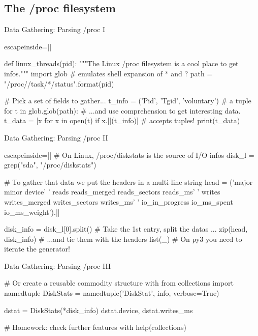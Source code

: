 \subsection{The /proc filesystem}
\begin{frame}[fragile]{Data Gathering: Parsing /proc I}
\begin{pythoncode*}{escapeinside=||}

def linux_threads(pid):
  """The Linux /proc filesystem is a cool place to get infos."""
  import glob # emulates shell expansion of * and ?
  path = "/proc/{}/task/*/status".format(pid)
  
  # Pick a set of fields to gather...
  t_info = ('Pid', 'Tgid', 'voluntary') # a tuple
  for t in glob.glob(path):
    # ...and use comprehension to get interesting data.
    t_data = [x for x in open(t) 
        if x.||(t_info)] #  accepts tuples!
    print(t_data)
\end{pythoncode*}
\end{frame}



\begin{frame}[fragile]{Data Gathering: Parsing /proc II}
\begin{pythoncode*}{escapeinside=||}
# On Linux, /proc/diskstats is the source of I/O infos
disk_l = grep("sda", "/proc/diskstats")

# To gather that data we put the headers in a multi-line string
head = ('major minor device'
        ' reads reads_merged reads_sectors reads_ms'
        ' writes writes_merged writes_sectors writes_ms'
        ' io_in_progress io_ms_spent io_ms_weight').||
        
disk_info = disk_l[0].split() # Take the 1st entry, split the datas ...
zip(head, disk_info)          # ...and tie them with the headers
list(_) # On py3 you need to iterate the generator!
\end{pythoncode*}
\end{frame}

\begin{frame}[fragile]{Data Gathering: Parsing /proc III}
\begin{pythoncode}
# Or create a reusable commodity structure with
from collections import namedtuple
DiskStats = namedtuple('DiskStat', info, verbose=True)

dstat = DiskStats(*disk_info)
dstat.device, dstat.writes_ms

# Homework: check further features with
help(collections) 
\end{pythoncode}
\end{frame}


\iffalse
\begin{frame}[fragile]{Data Gathering: subprocess}
\begin{pythoncode}
# foo
\end{pythoncode}
\end{frame}

\fi
